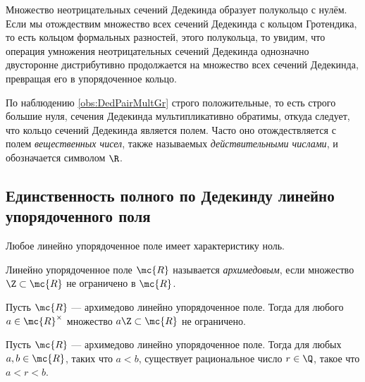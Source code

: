 \documentclass[
	extrafontsizes,
	11pt,
	hyphens,
]{memoir}
\begin{document}
\begin{observation}
Множество неотрицательных сечений Дедекинда образует полукольцо с нулём. Если мы отождествим множество всех сечений Дедекинда с кольцом Гротендика, то есть кольцом формальных разностей, этого полукольца, то увидим, что операция умножения
неотрицательных сечений Дедекинда
однозначно двусторонне дистрибутивно продолжается на множество всех сечений Дедекинда, превращая его в упорядоченное кольцо.
\end{observation}

\begin{observation}
По наблюдению \ref{obs:DedPairMultGr} строго положительные, то есть строго большие нуля, сечения Дедекинда мультипликативно обратимы, откуда следует, что кольцо сечений Дедекинда является полем.
Часто оно отождествляется с полем \emph{вещественных чисел}, также называемых \emph{действительными числами}, и обозначается символом \(\R\).
\end{observation}

\subsection{Единственность полного по Дедекинду линейно упорядоченного поля}

\begin{observation}
Любое линейно упорядоченное поле имеет характеристику ноль.
\end{observation}

\begin{definition}[\scshape Архимедово поле]
Линейно упорядоченное поле \(\mc{R}\) называется \emph{архимедовым}, если множество \(\Z \subset \mc{R}\) не ограничено в \(\mc{R}\).
\end{definition}

\begin{observation}
\label{obs:ArchField1}
Пусть \(\mc{R}\) --- архимедово линейно упорядоченное поле.
Тогда для любого \(a \in \mc{R}^\times\) множество \(a \Z \subset \mc{R}\) не ограничено.
\end{observation}

\begin{theorem}
\label{thm:ArchFieldDens}
Пусть \(\mc{R}\) --- архимедово линейно упорядоченное поле.
Тогда для любых \(a, b \in \mc{R}\), таких что \(a < b\), существует рациональное число \(r \in \Q\), такое что \(a < r < b\).
\end{theorem}
\end{document}
